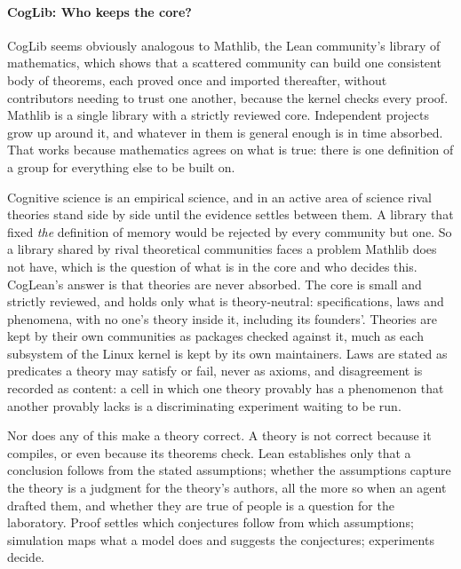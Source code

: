\documentclass[11pt]{article}
\begin{document}
\paragraph{CogLib: Who keeps the core?}
CogLib seems obviously analogous to Mathlib\cite{mathlib2020}, the Lean community's
library of mathematics, which shows that a scattered community can
build one consistent body of theorems, each proved once and imported
thereafter, without contributors needing to trust one another, because
the kernel checks every proof. Mathlib is a single library with a
strictly reviewed core. Independent projects grow up around it, and
whatever in them is general enough is in time absorbed. That works
because mathematics agrees on what is true: there is one definition of
a group for everything else to be built on.

Cognitive science is an empirical science, and in an active area of
science rival theories stand side by side until the evidence settles
between them. A library that fixed \emph{the} definition of memory
would be rejected by every community but one. So a library shared by rival theoretical communities faces a
problem Mathlib does not have, which is the question of what is in the
core and who decides this. CogLean's answer is that theories are never
absorbed. The core is small and strictly reviewed, and holds only what
is theory-neutral: specifications, laws and phenomena, with no one's
theory inside it, including its founders'. Theories are kept by their
own communities as packages checked against it, much as each subsystem
of the Linux kernel is kept by its own maintainers. Laws are stated as
predicates a theory may satisfy or fail, never as axioms, and
disagreement is recorded as content: a cell in which one theory
provably has a phenomenon that another provably lacks is a
discriminating experiment waiting to be run.

Nor does any of this make a theory correct. A theory is not correct
because it compiles, or even because its theorems check. Lean
establishes only that a conclusion follows from the stated assumptions;
whether the assumptions capture the theory is a judgment for the
theory's authors, all the more so when an agent drafted them, and
whether they are true of people is a question for the laboratory. Proof
settles which conjectures follow from which assumptions; simulation
maps what a model does and suggests the conjectures; experiments decide.
\end{document}
